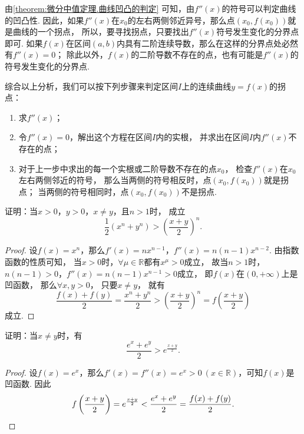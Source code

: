 由\cref{theorem:微分中值定理.曲线凹凸的判定} 可知，由\(f''(x)\)的符号可以判定曲线的凹凸性.
因此，如果\(f''(x)\)在\(x_0\)的左右两侧邻近异号，那么点\((x_0,f(x_0))\)就是曲线的一个拐点，
所以，要寻找拐点，只要找出\(f''(x)\)符号发生变化的分界点即可.
如果\(f(x)\)在区间\((a,b)\)内具有二阶连续导数，那么在这样的分界点处必然有\(f''(x)=0\)；
除此以外，\(f(x)\)的二阶导数不存在的点，也有可能是\(f''(x)\)的符号发生变化的分界点.

综合以上分析，我们可以按下列步骤来判定区间\(I\)上的连续曲线\(y=f(x)\)的拐点：
\begin{algorithm}[判定连续曲线的拐点]
\hfill
\begin{enumerate}
	\item 求\(f''(x)\)；

	\item 令\(f''(x) = 0\)，解出这个方程在区间\(I\)内的实根，
	并求出在区间\(I\)内\(f''(x)\)不存在的点；

	\item 对于上一步中求出的每一个实根或二阶导数不存在的点\(x_0\)，
	检查\(f''(x)\)在\(x_0\)左右两侧邻近的符号，
	那么当两侧的符号相反时，点\((x_0,f(x_0))\)就是拐点；
	当两侧的符号相同时，点\((x_0,f(x_0))\)不是拐点.
\end{enumerate}
\end{algorithm}

\begin{example}
证明：当\(x>0\)，\(y>0\)，\(x \neq y\)，且\(n>1\)时，
成立\begin{equation}\label{equation:微分中值定理.平均数的比较1}
	\frac{1}{2} (x^n+y^n) > \left(\frac{x+y}{2}\right)^n.
\end{equation}
\begin{proof}
设\(f(x) = x^n\)，那么\(f'(x) = n x^{n-1}\)，\(f''(x) = n(n-1) x^{n-2}\).
由指数函数的性质可知，
当\(x > 0\)时，\(\forall \mu \in \mathbb{R}\)都有\(x^{\mu} > 0\)成立，
故当\(n > 1\)时，\(n(n-1)>0\)，\(f''(x) = n(n-1) x^{n-1} > 0\)成立，
即\(f(x)\)在\((0,+\infty)\)上是凹函数，
那么\(\forall x,y>0\)，
只要\(x \neq y\)，
就有\begin{equation*}
	\frac{f(x)+f(y)}{2} = \frac{x^n+y^n}{2}
	> \left(\frac{x+y}{2}\right)^n = f\left(\frac{x+y}{2}\right)
\end{equation*}成立.
\end{proof}
\end{example}

\begin{example}
证明：当\(x \neq y\)时，有\begin{equation}
	\frac{e^x + e^y}{2} > e^{\frac{x+y}{2}}.
\end{equation}
\begin{proof}
设\(f(x) = e^x\)，那么\(f'(x) = f''(x) = e^x > 0\ (x\in\mathbb{R})\)，可知\(f(x)\)是凹函数.
因此\begin{equation*}
	f\left(\frac{x+y}{2}\right) = e^{\frac{x+y}{2}}
	< \frac{e^x+e^y}{2} = \frac{f(x)+f(y)}{2}.
	\qedhere
\end{equation*}
\end{proof}
\end{example}

